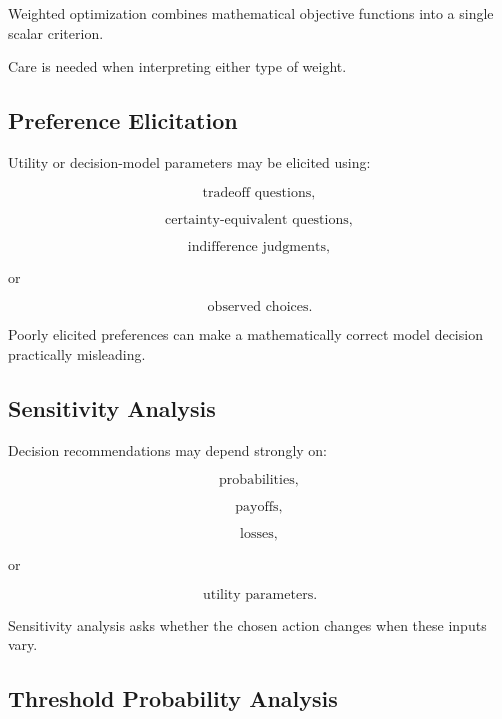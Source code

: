 Weighted optimization combines mathematical objective functions into a
single scalar criterion.

Care is needed when interpreting either type of weight.

\subsection{Preference Elicitation}
\label{subsec:preference-elicitation}

Utility or decision-model parameters may be elicited using:

\[
\boxed{
\text{tradeoff questions},
}
\]

\[
\boxed{
\text{certainty-equivalent questions},
}
\]

\[
\boxed{
\text{indifference judgments},
}
\]

or

\[
\boxed{
\text{observed choices}.
}
\]

Poorly elicited preferences can make a mathematically correct model
decision practically misleading.

\subsection{Sensitivity Analysis}
\label{subsec:decision-sensitivity-analysis}

Decision recommendations may depend strongly on:

\[
\boxed{
\text{probabilities},
}
\]

\[
\boxed{
\text{payoffs},
}
\]

\[
\boxed{
\text{losses},
}
\]

or

\[
\boxed{
\text{utility parameters}.
}
\]

Sensitivity analysis asks whether the chosen action changes when these
inputs vary.

\subsection{Threshold Probability Analysis}
\label{subsec:threshold-probability-analysis}

